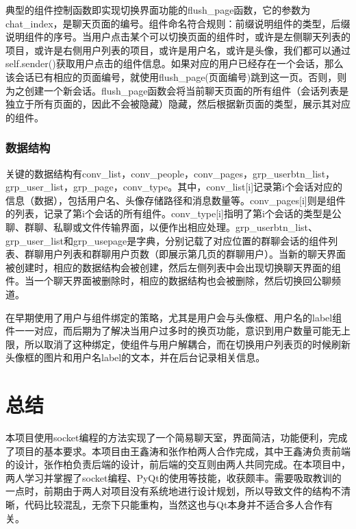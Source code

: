 \documentclass[12pt]{article} %
\begin{document}
\begin{sloppypar}
典型的组件控制函数即实现切换界面功能的flush\_page函数，它的参数为chat\_index，是聊天页面的编号。组件命名符合规则：前缀说明组件的类型，后缀说明组件的序号。当用户点击某个可以切换页面的组件时，或许是左侧聊天列表的项目，或许是右侧用户列表的项目，或许是用户名，或许是头像，我们都可以通过self.sender()获取用户点击的组件信息。如果对应的用户已经存在一个会话，那么该会话已有相应的页面编号，就使用flush\_page(页面编号)跳到这一页。否则，则为之创建一个新会话。flush\_page函数会将当前聊天页面的所有组件（会话列表是独立于所有页面的，因此不会被隐藏）隐藏，然后根据新页面的类型，展示其对应的组件。

\subsubsection{数据结构}

关键的数据结构有conv\_list，conv\_people，conv\_pages，grp\_userbtn\_list，grp\_user\_list，grp\_page，conv\_type。其中，conv\_list[i]记录第i个会话对应的信息（数据），包括用户名、头像存储路径和消息数量等。conv\_pages[i]则是组件的列表，记录了第i个会话的所有组件。conv\_type[i]指明了第i个会话的类型是公聊、群聊、私聊或文件传输界面，以便作出相应处理。grp\_userbtn\_list、grp\_user\_list和grp\_usepage是字典，分别记载了对应位置的群聊会话的组件列表、群聊用户列表和群聊用户页数（即展示第几页的群聊用户）。当新的聊天界面被创建时，相应的数据结构会被创建，然后左侧列表中会出现切换聊天界面的组件。当一个聊天界面被删除时，相应的数据结构也会被删除，然后切换回公聊频道。

在早期使用了用户与组件绑定的策略，尤其是用户会与头像框、用户名的label组件一一对应，而后期为了解决当用户过多时的换页功能，意识到用户数量可能无上限，所以取消了这种绑定，使组件与用户解耦合，而在切换用户列表页的时候刷新头像框的图片和用户名label的文本，并在后台记录相关信息。

\section{总结}

本项目使用socket编程的方法实现了一个简易聊天室，界面简洁，功能便利，完成了项目的基本要求。本项目由王鑫涛和张作柏两人合作完成，其中王鑫涛负责前端的设计，张作柏负责后端的设计，前后端的交互则由两人共同完成。在本项目中，两人学习并掌握了socket编程、PyQt的使用等技能，收获颇丰。需要吸取教训的一点时，前期由于两人对项目没有系统地进行设计规划，所以导致文件的结构不清晰，代码比较混乱，无奈下只能重构，当然这也与Qt本身并不适合多人合作有关。




\end{sloppypar}
\end{document}
